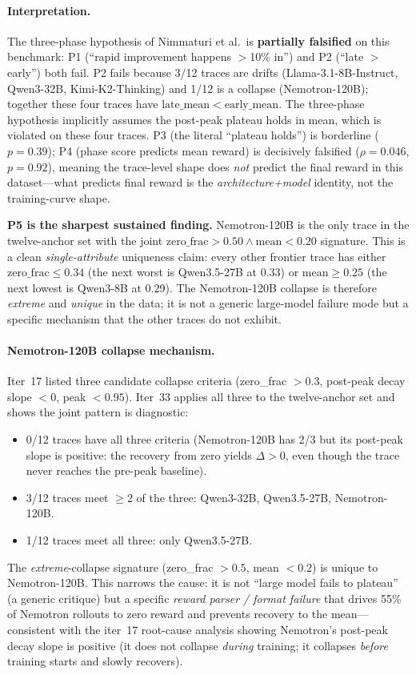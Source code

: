 \paragraph{Interpretation.}
The three-phase hypothesis of Nimmaturi et al.~is \textbf{partially
falsified} on this benchmark: P1 (``rapid improvement happens
$>$10\% in'') and P2 (``late $>$ early'') both fail. P2 fails because
3/12 traces are drifts (Llama-3.1-8B-Instruct, Qwen3-32B,
Kimi-K2-Thinking) and 1/12 is a collapse (Nemotron-120B); together
these four traces have $\mathrm{late\_mean} < \mathrm{early\_mean}$.
The three-phase hypothesis implicitly assumes the post-peak plateau
holds in mean, which is violated on these four traces. P3 (the literal
``plateau holds'') is borderline ($p=0.39$); P4 (phase score predicts
mean reward) is decisively falsified ($\rho = 0.046$, $p = 0.92$),
meaning the trace-level shape does \emph{not} predict the final reward
in this dataset---what predicts final reward is the
\emph{architecture+model} identity, not the training-curve shape.

\textbf{P5 is the sharpest sustained finding.} Nemotron-120B is the
only trace in the twelve-anchor set with the joint
$\mathrm{zero\_frac} > 0.50 \wedge \mathrm{mean} < 0.20$ signature.
This is a clean \emph{single-attribute} uniqueness claim: every other
frontier trace has either $\mathrm{zero\_frac} \le 0.34$ (the next
worst is Qwen3.5-27B at 0.33) or $\mathrm{mean} \ge 0.25$ (the next
lowest is Qwen3-8B at 0.29). The Nemotron-120B collapse is therefore
\emph{extreme} and \emph{unique} in the data; it is not a generic
large-model failure mode but a specific mechanism that the other
traces do not exhibit.

\paragraph{Nemotron-120B collapse mechanism.}
Iter~17 listed three candidate collapse criteria (zero\_frac $> 0.3$,
post-peak decay slope $< 0$, peak $< 0.95$). Iter~33 applies all three
to the twelve-anchor set and shows the joint pattern is
diagnostic:
\begin{itemize}
\item 0/12 traces have all three criteria (Nemotron-120B has 2/3 but
  its post-peak slope is positive: the recovery from zero yields
  $\Delta > 0$, even though the trace never reaches the pre-peak
  baseline).
\item 3/12 traces meet $\ge 2$ of the three: Qwen3-32B, Qwen3.5-27B,
  Nemotron-120B.
\item 1/12 traces meet all three: only Qwen3.5-27B.
\end{itemize}
The \emph{extreme}-collapse signature (zero\_frac $> 0.5$, mean $< 0.2$)
is unique to Nemotron-120B. This narrows the cause: it is not
``large model fails to plateau'' (a generic critique) but a specific
\emph{reward parser / format failure} that drives 55\% of Nemotron
rollouts to zero reward and prevents recovery to the mean---consistent
with the iter~17 root-cause analysis showing Nemotron's
post-peak decay slope is positive (it does not collapse
\emph{during} training; it collapses \emph{before} training starts and
slowly recovers).

